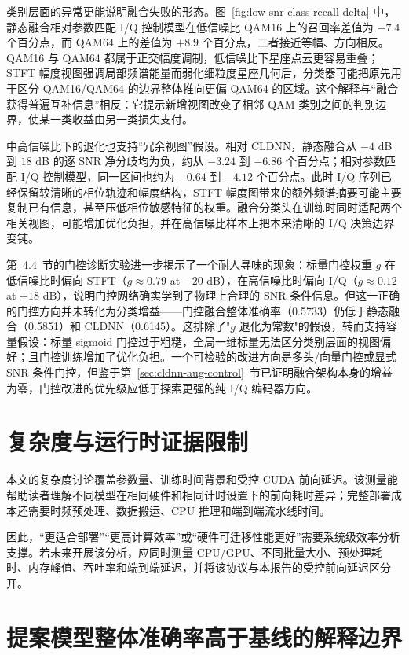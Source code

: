 类别层面的异常更能说明融合失败的形态。图~\ref{fig:low-snr-class-recall-delta} 中，静态融合相对参数匹配 I/Q 控制模型在低信噪比 QAM16 上的召回率差值为 \(-7.4\) 个百分点，而 QAM64 上的差值为 \(+8.9\) 个百分点，二者接近等幅、方向相反。QAM16 与 QAM64 都属于正交幅度调制，低信噪比下星座点云更容易重叠；STFT 幅度视图强调局部频谱能量而弱化细粒度星座几何后，分类器可能把原先用于区分 QAM16/QAM64 的边界整体推向更偏 QAM64 的区域。这个解释与“融合获得普遍互补信息”相反：它提示新增视图改变了相邻 QAM 类别之间的判别边界，使某一类收益由另一类损失支付。

中高信噪比下的退化也支持“冗余视图”假设。相对 CLDNN，静态融合从 \(-4\) dB 到 \(18\) dB 的逐 SNR 净分歧均为负，约从 \(-3.24\) 到 \(-6.86\) 个百分点；相对参数匹配 I/Q 控制模型，同一区间也约为 \(-0.64\) 到 \(-4.12\) 个百分点。此时 I/Q 序列已经保留较清晰的相位轨迹和幅度结构，STFT 幅度图带来的额外频谱摘要可能主要复制已有信息，甚至压低相位敏感特征的权重。融合分类头在训练时同时适配两个相关视图，可能增加优化负担，并在高信噪比样本上把本来清晰的 I/Q 决策边界变钝。

第~4.4~节的门控诊断实验进一步揭示了一个耐人寻味的现象：标量门控权重 $g$ 在低信噪比时偏向 STFT（$g \approx 0.79$ at $-20$ dB），在高信噪比时偏向 I/Q（$g \approx 0.12$ at $+18$ dB），说明门控网络确实学到了物理上合理的 SNR 条件信息。但这一正确的门控方向并未转化为分类增益——门控融合整体准确率（0.5733）仍低于静态融合（0.5851）和 CLDNN（0.6145）。这排除了"$g$ 退化为常数"的假设，转而支持容量假设：标量 sigmoid 门控过于粗糙，全局一维标量无法区分类别层面的视图偏好；且门控训练增加了优化负担。一个可检验的改进方向是多头/向量门控或显式 SNR 条件门控，但鉴于第~\ref{sec:cldnn-aug-control}~节已证明融合架构本身的增益为零，门控改进的优先级应低于探索更强的纯 I/Q 编码器方向。

\section{复杂度与运行时证据限制}

本文的复杂度讨论覆盖参数量、训练时间背景和受控 CUDA 前向延迟。该测量能帮助读者理解不同模型在相同硬件和相同计时设置下的前向耗时差异；完整部署成本还需要时频预处理、数据搬运、CPU 推理和端到端流水线时间。

因此，“更适合部署”“更高计算效率”或“硬件可迁移性能更好”需要系统级效率分析支撑。若未来开展该分析，应同时测量 CPU/GPU、不同批量大小、预处理耗时、内存峰值、吞吐率和端到端延迟，并将该协议与本报告的受控前向延迟区分开。

\section{提案模型整体准确率高于基线的解释边界}

